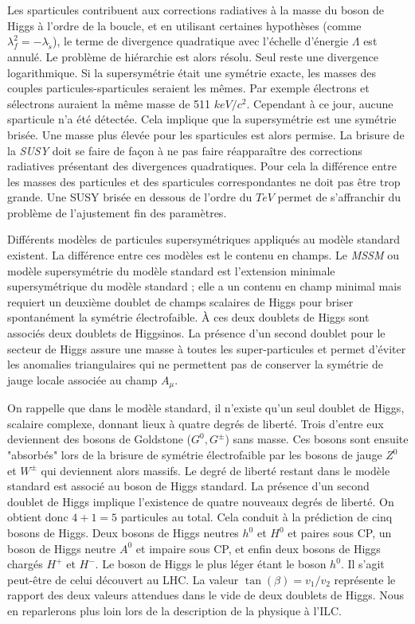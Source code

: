   Les sparticules contribuent aux corrections radiatives \`a la masse du boson de Higgs \`a l'ordre de la boucle, et en utilisant certaines hypoth\`eses (comme $\lambda_f^2 = -\lambda_{\widetilde{s}}$), le terme de divergence quadratique avec l'\'echelle d'énergie $\Lambda$ est annul\'e. Le probl\`eme de hiérarchie est alors r\'esolu. Seul reste une divergence logarithmique. Si la supersym\'etrie \'etait une sym\'etrie exacte, les masses des couples particules-sparticules seraient les m\^emes. Par exemple \'electrons et s\'electrons auraient la même masse de 511 $keV/c^2$. Cependant \`a ce jour, aucune sparticule n'a \'et\'e d\'etect\'ee. Cela implique que la supersymétrie est une sym\'etrie bris\'ee. Une masse plus \'elev\'ee pour les sparticules est alors permise. La brisure de la \textit{SUSY} doit se faire de façon \`a ne pas faire r\'eappara\^itre des corrections radiatives pr\'esentant des divergences quadratiques. Pour cela la diff\'erence entre les masses des particules et des sparticules correspondantes ne doit pas \^etre trop grande. Une SUSY bris\'ee en dessous de l'ordre du $TeV$ permet de s'affranchir du probl\`eme de l'ajustement fin des param\`etres. 
  \medskip
  
  Diff\'erents mod\`eles de particules supersym\'etriques appliqu\'es au mod\`ele standard existent. La diff\'erence entre ces mod\`eles est le contenu en champs. Le \textit{MSSM} ou mod\`ele supersymétrie du mod\`ele standard est l'extension minimale supersymétrique du modèle standard ; elle a un contenu en champ minimal mais requiert un deuxième doublet de champs scalaires de Higgs pour briser spontanément la symétrie électrofaible. \`A ces deux doublets de Higgs sont associ\'es deux doublets de Higgsinos. La pr\'esence d'un second doublet pour le secteur de Higgs assure une masse \`a toutes les super-particules et permet d'\'eviter les anomalies triangulaires qui ne permettent pas de conserver la sym\'etrie de jauge locale associ\'ee au champ $A_{\mu}$.
  
  
  \medskip
  
  On rappelle que dans le mod\`ele standard, il n'existe qu'un seul doublet de Higgs, scalaire complexe, donnant lieux \`a quatre degr\'es de libert\'e. Trois d'entre eux deviennent des bosons de Goldstone ($G^0,G^{\pm}$) sans masse. Ces bosons sont ensuite "absorb\'es" lors de la brisure de sym\'etrie \'electrofaible par les bosons de jauge $Z^0$ et $W^{\pm}$ qui deviennent alors massifs. Le degr\'e de libert\'e restant dans le mod\`ele standard est associ\'e au boson de Higgs standard. La pr\'esence d'un second doublet de Higgs implique l'existence de quatre nouveaux degr\'es de libert\'e. On obtient donc $4 + 1 = 5$ particules au total. Cela conduit \`a la pr\'ediction de cinq bosons de Higgs. Deux bosons de Higgs neutres  $h^0$ et $H^0$ et paires sous CP, un boson de Higgs neutre $A^0$ et impaire sous CP, et enfin deux bosons de Higgs charg\'es $H^+$ et $H^-$. Le boson de Higgs le plus l\'eger \'etant le boson $h^0$. Il s'agit peut-être de celui d\'ecouvert au LHC. La valeur $\tan(\beta) = v_1/v_2$ repr\'esente le rapport des deux valeurs attendues dans le vide de deux doublets de Higgs. Nous en reparlerons plus loin lors de la description de la physique \`a l'ILC.

